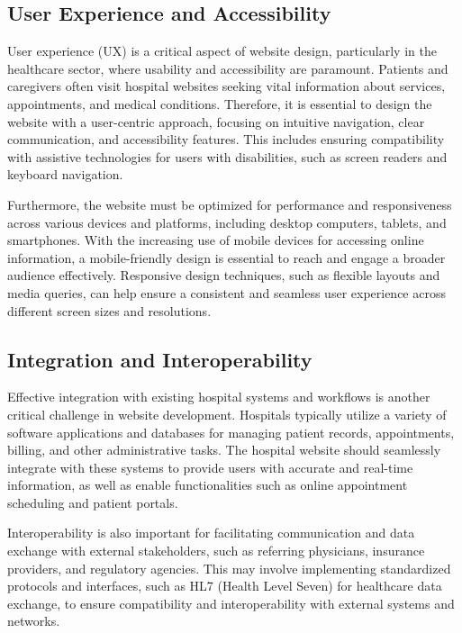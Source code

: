 \documentclass{article}
\begin{document}
\subsection{User Experience and Accessibility}
User experience (UX) is a critical aspect of website design, particularly in the healthcare sector, where usability and accessibility are paramount. Patients and caregivers often visit hospital websites seeking vital information about services, appointments, and medical conditions. Therefore, it is essential to design the website with a user-centric approach, focusing on intuitive navigation, clear communication, and accessibility features. This includes ensuring compatibility with assistive technologies for users with disabilities, such as screen readers and keyboard navigation.

Furthermore, the website must be optimized for performance and responsiveness across various devices and platforms, including desktop computers, tablets, and smartphones. With the increasing use of mobile devices for accessing online information, a mobile-friendly design is essential to reach and engage a broader audience effectively. Responsive design techniques, such as flexible layouts and media queries, can help ensure a consistent and seamless user experience across different screen sizes and resolutions.

\subsection{Integration and Interoperability}
Effective integration with existing hospital systems and workflows is another critical challenge in website development. Hospitals typically utilize a variety of software applications and databases for managing patient records, appointments, billing, and other administrative tasks. The hospital website should seamlessly integrate with these systems to provide users with accurate and real-time information, as well as enable functionalities such as online appointment scheduling and patient portals.

Interoperability is also important for facilitating communication and data exchange with external stakeholders, such as referring physicians, insurance providers, and regulatory agencies. This may involve implementing standardized protocols and interfaces, such as HL7 (Health Level Seven) for healthcare data exchange, to ensure compatibility and interoperability with external systems and networks.

\end{document}
